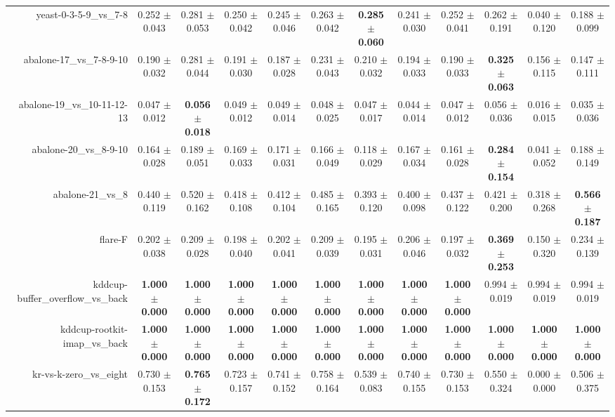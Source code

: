 \begin{table}[!ht]
{\begin{tabular}{r c c c c c c c c c c c}
yeast-0-3-5-9\_vs\_7-8 & 0.252 $\pm$ 0.043 & 0.281 $\pm$ 0.053 & 0.250 $\pm$ 0.042 & 0.245 $\pm$ 0.046 & 0.263 $\pm$ 0.042 & \textbf{0.285 $\pm$ 0.060} & 0.241 $\pm$ 0.030 & 0.252 $\pm$ 0.041 & 0.262 $\pm$ 0.191 & 0.040 $\pm$ 0.120 & 0.188 $\pm$ 0.099 \\
abalone-17\_vs\_7-8-9-10 & 0.190 $\pm$ 0.032 & 0.281 $\pm$ 0.044 & 0.191 $\pm$ 0.030 & 0.187 $\pm$ 0.028 & 0.231 $\pm$ 0.043 & 0.210 $\pm$ 0.032 & 0.194 $\pm$ 0.033 & 0.190 $\pm$ 0.033 & \textbf{0.325 $\pm$ 0.063} & 0.156 $\pm$ 0.115 & 0.147 $\pm$ 0.111 \\
abalone-19\_vs\_10-11-12-13 & 0.047 $\pm$ 0.012 & \textbf{0.056 $\pm$ 0.018} & 0.049 $\pm$ 0.012 & 0.049 $\pm$ 0.014 & 0.048 $\pm$ 0.025 & 0.047 $\pm$ 0.017 & 0.044 $\pm$ 0.014 & 0.047 $\pm$ 0.012 & 0.056 $\pm$ 0.036 & 0.016 $\pm$ 0.015 & 0.035 $\pm$ 0.036 \\
abalone-20\_vs\_8-9-10 & 0.164 $\pm$ 0.028 & 0.189 $\pm$ 0.051 & 0.169 $\pm$ 0.033 & 0.171 $\pm$ 0.031 & 0.166 $\pm$ 0.049 & 0.118 $\pm$ 0.029 & 0.167 $\pm$ 0.034 & 0.161 $\pm$ 0.028 & \textbf{0.284 $\pm$ 0.154} & 0.041 $\pm$ 0.052 & 0.188 $\pm$ 0.149 \\
abalone-21\_vs\_8 & 0.440 $\pm$ 0.119 & 0.520 $\pm$ 0.162 & 0.418 $\pm$ 0.108 & 0.412 $\pm$ 0.104 & 0.485 $\pm$ 0.165 & 0.393 $\pm$ 0.120 & 0.400 $\pm$ 0.098 & 0.437 $\pm$ 0.122 & 0.421 $\pm$ 0.200 & 0.318 $\pm$ 0.268 & \textbf{0.566 $\pm$ 0.187} \\
flare-F & 0.202 $\pm$ 0.038 & 0.209 $\pm$ 0.028 & 0.198 $\pm$ 0.040 & 0.202 $\pm$ 0.041 & 0.209 $\pm$ 0.039 & 0.195 $\pm$ 0.031 & 0.206 $\pm$ 0.046 & 0.197 $\pm$ 0.032 & \textbf{0.369 $\pm$ 0.253} & 0.150 $\pm$ 0.320 & 0.234 $\pm$ 0.139 \\
kddcup-buffer\_overflow\_vs\_back & \textbf{1.000 $\pm$ 0.000} & \textbf{1.000 $\pm$ 0.000} & \textbf{1.000 $\pm$ 0.000} & \textbf{1.000 $\pm$ 0.000} & \textbf{1.000 $\pm$ 0.000} & \textbf{1.000 $\pm$ 0.000} & \textbf{1.000 $\pm$ 0.000} & \textbf{1.000 $\pm$ 0.000} & 0.994 $\pm$ 0.019 & 0.994 $\pm$ 0.019 & 0.994 $\pm$ 0.019 \\
kddcup-rootkit-imap\_vs\_back & \textbf{1.000 $\pm$ 0.000} & \textbf{1.000 $\pm$ 0.000} & \textbf{1.000 $\pm$ 0.000} & \textbf{1.000 $\pm$ 0.000} & \textbf{1.000 $\pm$ 0.000} & \textbf{1.000 $\pm$ 0.000} & \textbf{1.000 $\pm$ 0.000} & \textbf{1.000 $\pm$ 0.000} & \textbf{1.000 $\pm$ 0.000} & \textbf{1.000 $\pm$ 0.000} & \textbf{1.000 $\pm$ 0.000} \\
kr-vs-k-zero\_vs\_eight & 0.730 $\pm$ 0.153 & \textbf{0.765 $\pm$ 0.172} & 0.723 $\pm$ 0.157 & 0.741 $\pm$ 0.152 & 0.758 $\pm$ 0.164 & 0.539 $\pm$ 0.083 & 0.740 $\pm$ 0.155 & 0.730 $\pm$ 0.153 & 0.550 $\pm$ 0.324 & 0.000 $\pm$ 0.000 & 0.506 $\pm$ 0.375 \\

\end{tabular}}
\end{table}
